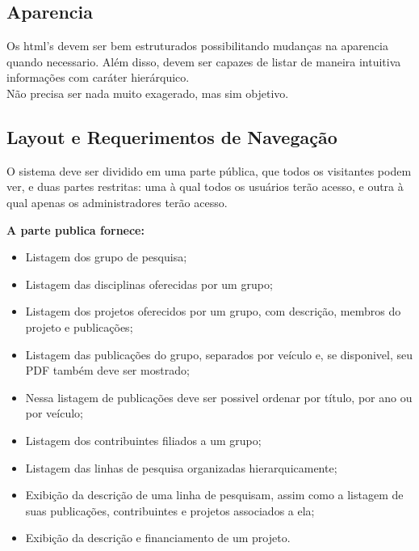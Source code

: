 \documentclass[11pt, a4paper]{article}
\begin{document}
		\subsection{Aparencia}
			Os html's devem ser bem estruturados possibilitando mudanças na
			aparencia quando necessario. Além disso, devem ser capazes de
			listar de maneira intuitiva informações com caráter hierárquico.\\
			\indent Não precisa ser nada muito exagerado, mas sim objetivo.
			
		\subsection{Layout e Requerimentos de Navegação}
			O sistema deve ser dividido em uma parte pública, que todos os
			visitantes podem ver, e duas partes restritas: uma à qual todos
			os usuários terão acesso, e outra à qual apenas os administradores
			terão acesso.
			
			\noindent \textbf{A parte publica fornece:}
			\begin{itemize}
				\item Listagem dos grupo de pesquisa;
				\item Listagem das disciplinas oferecidas por um grupo;
				\item Listagem dos projetos oferecidos por um grupo, com
				descrição, membros do projeto e publicações;
				\item Listagem das publicações do grupo, separados por veículo
				e, se disponivel, seu PDF também deve ser mostrado;
				\item Nessa listagem de publicações deve ser possivel ordenar
				por título, por ano ou por veículo;
				\item Listagem dos contribuintes filiados a um grupo;
				\item Listagem das linhas de pesquisa organizadas
				hierarquicamente;
				\item Exibição da descrição de uma linha de pesquisam, assim
				como a listagem de suas publicações, contribuintes e projetos
				associados a ela;
				\item Exibição da descrição e financiamento de um projeto.
			\end{itemize}
			
\end{document}
